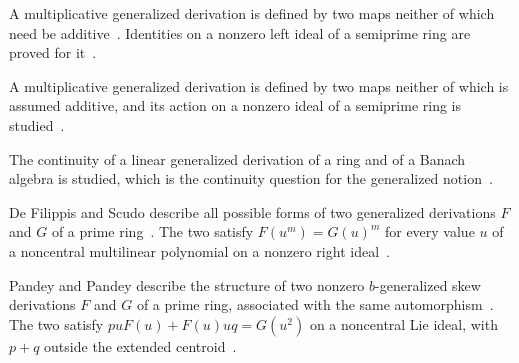 A multiplicative generalized derivation is defined by two maps neither of
which need be additive~\cite{WlSomeIdentitiesRelated2023}. Identities on a nonzero left ideal of a semiprime
ring are proved for it~\cite{WlSomeIdentitiesRelated2023}.

A multiplicative generalized derivation is defined by two maps neither of
which is assumed additive, and its action on a nonzero ideal of a semiprime
ring is studied~\cite{WlMultiplicativeGeneralizedD2018}.

The continuity of a linear generalized derivation of a ring and of a Banach
algebra is studied, which is the continuity question for the generalized
notion~\cite{WlOnContinuousLinearGeneralizedD2021}.

De Filippis and Scudo describe all possible forms of two generalized
derivations $F$ and $G$ of a prime ring~\cite{WlGeneralizedDerivationsWhichExt2015}. The two satisfy $F(u^m)=G(u)^m$ for
every
value $u$ of a noncentral multilinear polynomial on a nonzero right
ideal~\cite{WlGeneralizedDerivationsWhichExt2015}.

Pandey and Pandey describe the structure of two nonzero $b$-generalized skew
derivations $F$ and $G$ of a prime ring, associated with the same
automorphism~\cite{WlACharacterizationOfBGeneralize2023}. The two satisfy $p u F(u)+F(u) u q=G(u^2)$ on a noncentral Lie
ideal, with $p+q$ outside the extended
centroid~\cite{WlACharacterizationOfBGeneralize2023}.

